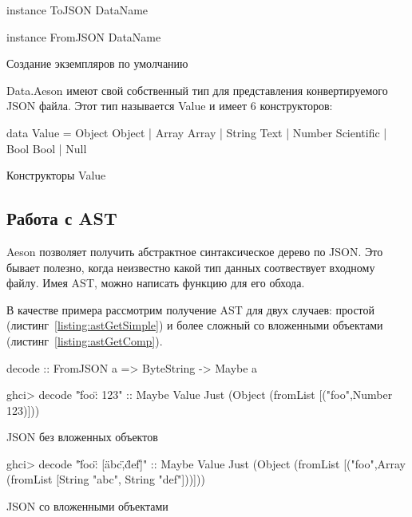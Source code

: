 \begin{ListingEnv}[H]
\begin{Verb}
instance ToJSON DataName

instance FromJSON DataName
\end{Verb}
\caption{Создание экземпляров по умолчанию}
\label{listing:genericData}
\end{ListingEnv}

Data.Aeson имеют свой собственный тип для представления конвертируемого JSON файла. Этот тип называется Value и имеет 6 конструкторов:

\begin{ListingEnv}[H]
\begin{Verb}
data Value
  = Object Object
  | Array Array
  | String Text
  | Number Scientific
  | Bool Bool
  | Null
\end{Verb}
\caption{Конструкторы Value}
\label{listing:value}
\end{ListingEnv}

\subsection{Работа с AST}

Aeson позволяет получить абстрактное синтаксическое дерево по JSON. Это бывает полезно, когда неизвестно какой тип данных 
соотвествует входному файлу. Имея AST, можно написать функцию для его обхода.~\cite{aesonEx}

В качестве примера рассмотрим получение AST для двух случаев: простой (листинг~\ref{listing:astGetSimple}) и более сложный со вложенными объектами (листинг~\ref{listing:astGetComp}).

\begin{ListingEnv}[H]
\begin{Verb}
decode :: FromJSON a => ByteString -> Maybe a

ghci> decode "{\"foo\": 123}" :: Maybe Value
Just (Object (fromList [("foo",Number 123)]))
\end{Verb}
\caption{JSON без вложенных объектов}
\label{listing:astGetSimple}
\end{ListingEnv}

\begin{ListingEnv}[H]
\begin{Verb}
ghci> decode "{\"foo\": [\"abc\",\"def\"]}" :: Maybe Value
Just (Object (fromList [("foo",Array (fromList [String "abc", 
                                               String "def"]))]))
\end{Verb}
\caption{JSON со вложенными объектами}
\label{listing:astGetComp}
\end{ListingEnv}

